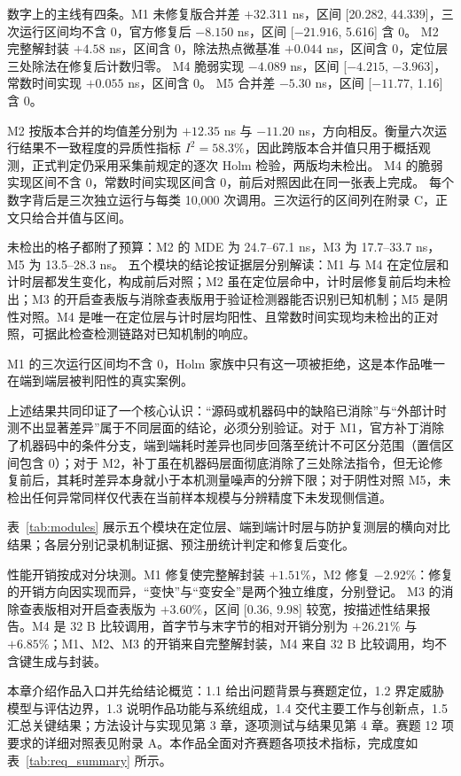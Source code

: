 数字上的主线有四条。M1 未修复版合并差 $+32.311$ ns，区间 [20.282, 44.339]，三次运行区间均不含 0，官方修复后 $-8.150$ ns，区间 [$-21.916$, 5.616] 含 0。%
M2 完整解封装 $+4.58$ ns，区间含 0，除法热点微基准 $+0.044$ ns，区间含 0，定位层三处除法在修复后计数归零。%
M4 脆弱实现 $-4.089$ ns，区间 [$-4.215$, $-3.963$]，常数时间实现 $+0.055$ ns，区间含 0。%
M5 合并差 $-5.30$ ns，区间 [$-11.77$, 1.16] 含 0。%

M2 按版本合并的均值差分别为 $+12.35$ ns 与 $-11.20$ ns，方向相反。衡量六次运行结果不一致程度的异质性指标 $I^2=58.3\%$，因此跨版本合并值只用于概括观测，正式判定仍采用采集前规定的逐次 Holm 检验，两版均未检出。%
M4 的脆弱实现区间不含 0，常数时间实现区间含 0，前后对照因此在同一张表上完成。%
每个数字背后是三次独立运行与每类 10,000 次调用。三次运行的区间列在附录 C，正文只给合并值与区间。

未检出的格子都附了预算：M2 的 MDE 为 24.7--67.1 ns，M3 为 17.7--33.7 ns，M5 为 13.5--28.3 ns。%
五个模块的结论按证据层分别解读：M1 与 M4 在定位层和计时层都发生变化，构成前后对照；M2 虽在定位层命中，计时层修复前后均未检出；M3 的开启查表版与消除查表版用于验证检测器能否识别已知机制；M5 是阴性对照。M4 是唯一在定位层与计时层均阳性、且常数时间实现均未检出的正对照，可据此检查检测链路对已知机制的响应。

M1 的三次运行区间均不含 0，Holm 家族中只有这一项被拒绝，这是本作品唯一在端到端层被判阳性的真实案例。%

上述结果共同印证了一个核心认识：“源码或机器码中的缺陷已消除”与“外部计时测不出显著差异”属于不同层面的结论，必须分别验证。对于 M1，官方补丁消除了机器码中的条件分支，端到端耗时差异也同步回落至统计不可区分范围（置信区间包含 0）；对于 M2，补丁虽在机器码层面彻底消除了三处除法指令，但无论修复前后，其耗时差异本身就小于本机测量噪声的分辨下限；对于阴性对照 M5，未检出任何异常同样仅代表在当前样本规模与分辨精度下未发现侧信道。

表~\ref{tab:modules} 展示五个模块在定位层、端到端计时层与防护复测层的横向对比结果；各层分别记录机制证据、预注册统计判定和修复后变化。

性能开销按成对分块测。M1 修复使完整解封装 $+1.51\%$，M2 修复 $-2.92\%$：修复的开销方向因实现而异，“变快”与“变安全”是两个独立维度，分别登记。%
M3 的消除查表版相对开启查表版为 $+3.60\%$，区间 [0.36, 9.98] 较宽，按描述性结果报告。M4 是 32 B 比较调用，首字节与末字节的相对开销分别为 $+26.21\%$ 与 $+6.85\%$；M1、M2、M3 的开销来自完整解封装，M4 来自 32 B 比较调用，均不含键生成与封装。

本章介绍作品入口并先给结论概览：1.1 给出问题背景与赛题定位，1.2 界定威胁模型与评估边界，1.3 说明作品功能与系统组成，1.4 交代主要工作与创新点，1.5 汇总关键结果；方法设计与实现见第 3 章，逐项测试与结果见第 4 章。赛题 12 项要求的详细对照表见附录 A。本作品全面对齐赛题各项技术指标，完成度如表~\ref{tab:req_summary} 所示。

